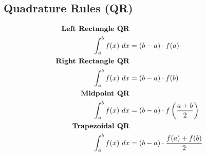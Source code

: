 \subsection{Quadrature Rules (QR)}
    \vspace{-1.5em}
    \begin{align*}
        \textrm{\textbf{Left Rectangle QR}}\\
        \int_a^b f(x) \ dx &= (b-a) \cdot f(a)\\
        \textrm{\textbf{Right Rectangle QR}}\\
        \int_a^b f(x) \ dx &= (b-a) \cdot f(b)\\
        \textrm{\textbf{Midpoint QR}}\\
        \int_a^b f(x) \ dx &= (b-a) \cdot f\left(\frac{a+b}{2}\right)\\
        \textrm{\textbf{Trapezoidal QR}}\\
        \int_a^b f(x) \ dx &= (b-a) \cdot \frac{f(a)+f(b)}{2}
    \end{align*}